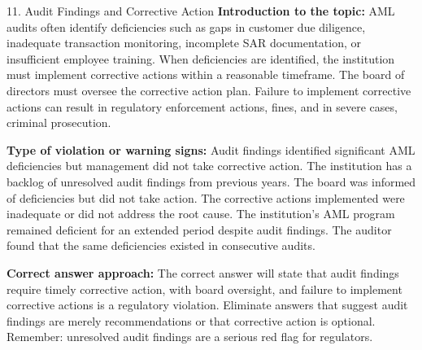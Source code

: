 \documentclass[11pt,a4paper]{beamer}
\begin{document}
\begin{frame}{11. Audit Findings and Corrective Action}
\tiny
\noindent\textbf{Introduction to the topic:} AML audits often identify deficiencies such as gaps in customer due diligence, inadequate transaction monitoring, incomplete SAR documentation, or insufficient employee training. When deficiencies are identified, the institution must implement corrective actions within a reasonable timeframe. The board of directors must oversee the corrective action plan. Failure to implement corrective actions can result in regulatory enforcement actions, fines, and in severe cases, criminal prosecution.

\vspace{0.1cm}
\noindent\textbf{Type of violation or warning signs:} Audit findings identified significant AML deficiencies but management did not take corrective action. The institution has a backlog of unresolved audit findings from previous years. The board was informed of deficiencies but did not take action. The corrective actions implemented were inadequate or did not address the root cause. The institution's AML program remained deficient for an extended period despite audit findings. The auditor found that the same deficiencies existed in consecutive audits.

\vspace{0.1cm}
\noindent\textbf{Correct answer approach:} The correct answer will state that audit findings require timely corrective action, with board oversight, and failure to implement corrective actions is a regulatory violation. Eliminate answers that suggest audit findings are merely recommendations or that corrective action is optional. Remember: unresolved audit findings are a serious red flag for regulators.
\end{frame}
\end{document}
